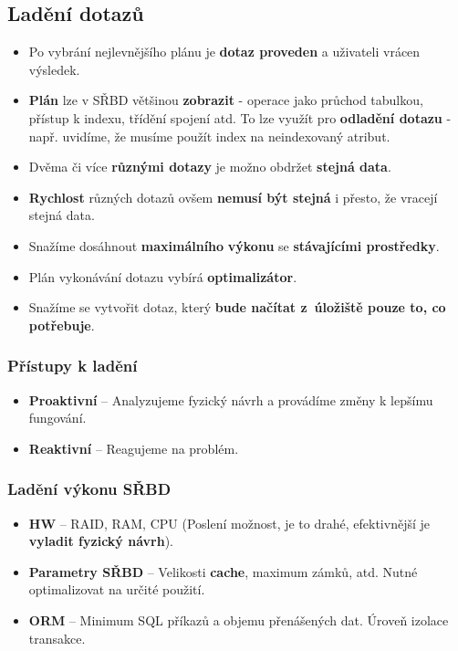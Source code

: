 \subsection{Ladění dotazů}
\begin{itemize}
	\item Po vybrání nejlevnějšího plánu je \textbf{dotaz proveden} a uživateli vrácen výsledek.
	\item \textbf{Plán} lze v SŘBD většinou \textbf{zobrazit} - operace jako průchod tabulkou, přístup k indexu, třídění spojení atd. To lze využít pro \textbf{odladění dotazu} - např. uvidíme, že musíme použít index na neindexovaný atribut.
	\item Dvěma či více \textbf{různými dotazy} je možno obdržet \textbf{stejná data}. 
	\item \textbf{Rychlost} různých dotazů ovšem\textbf{ nemusí být stejná }i přesto, že vracejí stejná data.
	\item Snažíme dosáhnout \textbf{maximálního} \textbf{výkonu} se \textbf{stávajícími prostředky}.
	\item Plán vykonávání dotazu vybírá \textbf{optimalizátor}.
	\item Snažíme se vytvořit dotaz, který\textbf{ bude načítat z úložiště pouze to, co potřebuje}.
\end{itemize}

\subsubsection{Přístupy k ladění}
\begin{itemize}
\item \textbf{Proaktivní} -- Analyzujeme fyzický návrh a provádíme změny k lepšímu fungování.
\item \textbf{Reaktivní} -- Reagujeme na problém.
\end{itemize}

\subsubsection{Ladění výkonu SŘBD}
\begin{itemize}
	\item \textbf{HW} -- RAID, RAM, CPU (Poslení možnost, je to drahé, efektivnější je \textbf{vyladit fyzický návrh}).
	\item \textbf{Parametry SŘBD} -- Velikosti \textbf{cache}, maximum zámků, atd. Nutné optimalizovat na určité použití.
	\item \textbf{ORM} -- Minimum SQL příkazů a objemu přenášených dat. Úroveň izolace transakce.
\end{itemize}